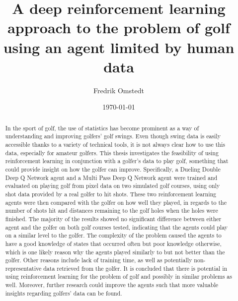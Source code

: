\documentclass{kththesis}
\title{A deep reinforcement learning approach to the problem of golf using an agent limited by human data}
\author{Fredrik Omstedt}
\date{\today}
\begin{document}
\frontmatter

\titlepage

\begin{abstract}
In the sport of golf, the use of statistics has become prominent as a way of understanding and improving golfers' golf swings. Even though swing data is easily accessible thanks to a variety of technical tools, it is not always clear how to use this data, especially for amateur golfers. This thesis investigates the feasibility of using reinforcement learning in conjunction with a golfer's data to play golf, something that could provide insight on how the golfer can improve. Specifically, a Dueling Double Deep Q Network agent and a Multi Pass Deep Q Network agent were trained and evaluated on playing golf from pixel data on two simulated golf courses, using only shot data provided by a real golfer to hit shots. These two reinforcement learning agents were then compared with the golfer on how well they played, in regards to the number of shots hit and distances remaining to the golf holes when the holes were finished. The majority of the results showed no significant difference between either agent and the golfer on both golf courses tested, indicating that the agents could play on a similar level to the golfer. The complexity of the problem caused the agents to have a good knowledge of states that occurred often but poor knowledge otherwise, which is one likely reason why the agents played similarly to but not better than the golfer. Other reasons include lack of training time, as well as potentially non-representative data retrieved from the golfer. It is concluded that there is potential in using reinforcement learning for the problem of golf and possibly in similar problems as well. Moreover, further research could improve the agents such that more valuable insights regarding golfers' data can be found.
\end{abstract}
\end{document}
